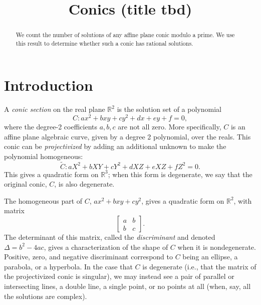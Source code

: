 \documentclass[10pt,a4paper]{amsart}
\numberwithin{equation}{section}
\numberwithin{figure}{section}
\theoremstyle{definition}
\theoremstyle{remark}
\theoremstyle{plain}
\theoremstyle{plain}
\theoremstyle{definition}
\theoremstyle{plain}
\theoremstyle{plain}
\newcommand{\R}{\mathbb{R}}
\begin{document}
 

    \title{Conics (title tbd)} 

\maketitle

\begin{abstract} 
	We count the number of solutions of any affine plane conic modulo a prime.
	We use this result to determine whether such a conic has rational solutions. 
\end{abstract}

\tableofcontents

\section{Introduction} 

	A \emph{conic section} on the real plane $\R^2$ is the solution set of 
	a polynomial
	\[ C: ax^2 + bxy + cy^2 + dx + ey + f = 0, \]
	where the degree-2 coefficients $a, b, c$ are not all zero. More specifically,
	$C$ is an affine plane algebraic curve, given by a degree 2 polynomial, over
	the reals. This conic can be \emph{projectivized} by adding an additional
	unknown to make the polynomial homogeneous:
	\[ \widetilde{C}: aX^2 + bXY + cY^2 + dXZ + eXZ + fZ^2 = 0. \]
	This gives a quadratic form on $\R^3$; when this form is degenerate, we
	say that the original conic, $C$, is also degenerate.
	
	The homogeneous part of $C$, $ax^2 + bxy + cy^2$, gives a quadratic form
	on $\R^2$, with matrix
	\[ \begin{bmatrix}
	a & b \\
	b & c
	\end{bmatrix}. \]
	The determinant of this matrix, called the \emph{discriminant} and
	denoted $\Delta = b^2 - 4ac$, gives a characterization of the shape of $C$
	when it is nondegenerate. Positive, zero, and negative discriminant
	correspond to $C$ being an ellipse, a parabola, or a hyperbola. In the
	case that $C$ is degenerate (i.e., that the matrix of the projectivized
	conic is singular), we may instead see a pair of parallel or intersecting 
	lines, a double line, a single point, or no points at all (when, say,
	all the solutions are complex).
	
\end{document}
